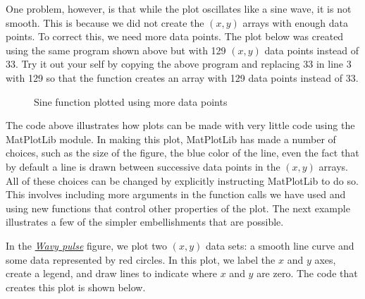 \documentclass[letterpaper,10pt,english]{sphinxmanual}
\begin{document}
One problem, however, is that while the plot oscillates like a sine wave, it is not smooth.  This is because we did not create the $(x,y)$ arrays with enough data points.  To correct this, we need more data points.  The plot below was created using the same program shown above but with 129 $(x,y)$ data points instead of 33.  Try it out your self by copying the above program and replacing 33 in line 3 with 129 so that the function  creates an array with 129 data points instead of 33.
\begin{figure}[htbp]
\centering
\capstart

\caption{Sine function plotted using more data points}\label{chap5/chap5_plot:fig-sineplotdenserxy}\end{figure}

The code above illustrates how plots can be made with very little code using the MatPlotLib module.  In making this plot, MatPlotLib has made a number of choices, such as the size of the figure, the blue color of the line, even the fact that by default a line is drawn between successive data points in the $(x,y)$ arrays.  All of these choices can be changed by explicitly instructing MatPlotLib to do so.  This involves including more arguments in the function calls we have used and using new functions that control other properties of the plot.  The next example illustrates a few of the simpler embellishments that are possible.

In the {\hyperref[chap5/chap5_plot:fig-wavypulse]{\emph{Wavy pulse}}} figure, we plot two $(x,y)$ data sets: a smooth line curve and some data represented by red circles.  In this plot, we label the $x$ and $y$ axes, create a legend, and draw lines to indicate where $x$ and $y$ are zero.  The code that creates this plot is shown below.
\end{document}
